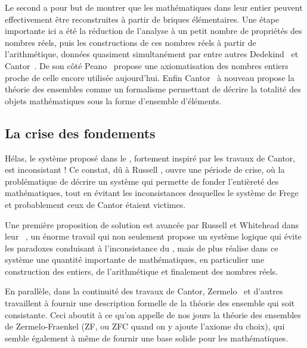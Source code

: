 Le second a pour but de montrer que les mathématiques dans leur entier peuvent
effectivement être reconstruites à partir de briques élémentaires. Une étape
importante ici a été la réduction de l’analyse à un petit nombre de propriétés
des nombres réels, puis les constructions de ces nombres réels à partir
de l’arithmétique, données quasiment simultanément par entre autres
Dedekind~ et Cantor~.
De son côté Peano~ propose
une axiomatisation des nombres entiers proche de celle encore utilisée aujourd’hui.
Enfin Cantor~ à nouveau
propose la théorie des ensembles comme un formalisme permettant
de décrire la totalité des objets mathématiques sous la forme d’ensemble
d’éléments.

\subsection{La crise des fondements}
Hélas, le système proposé dans le , fortement inspiré par
les travaux de Cantor, est inconsistant !
Ce constat, dû à Russell ,
ouvre une période de crise, où la problématique de décrire un système qui permette
de fonder l’entièreté des mathématiques,
tout en évitant les inconsistances desquelles
le système de Frege et probablement ceux de Cantor étaient victimes.

Une première proposition de solution est avancée par Russell et Whitehead dans leur
~,
un énorme travail qui non seulement propose un système
logique qui évite les paradoxes conduisant à l’inconsistance du
, mais de plus réalise dans ce système une quantité importante
de mathématiques, en particulier une construction des entiers, de l’arithmétique et
finalement des nombres réels.

En parallèle, dans la continuité des travaux de Cantor,
Zermelo~ et
d’autres travaillent à fournir une description formelle de la théorie des ensemble
qui soit consistante. Ceci aboutit à ce qu’on appelle de nos jours la
théorie des ensembles de Zermelo-Fraenkel (ZF, ou ZFC quand on y ajoute l’axiome
du choix), qui semble également à même de fournir une base solide pour les
mathématiques.

